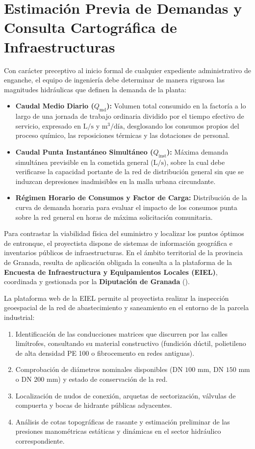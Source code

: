\documentclass{report}
\begin{document}
\section{Estimación Previa de Demandas y Consulta Cartográfica de Infraestructuras}

Con carácter preceptivo al inicio formal de cualquier expediente administrativo de enganche, el equipo de ingeniería debe determinar de manera rigurosa las magnitudes hidráulicas que definen la demanda de la planta:
\begin{itemize}
    \item \textbf{Caudal Medio Diario ($Q_{\text{md}}$):} Volumen total consumido en la factoría a lo largo de una jornada de trabajo ordinaria dividido por el tiempo efectivo de servicio, expresado en $\text{L/s}$ y $\text{m}^3/\text{día}$, desglosando los consumos propios del proceso químico, las reposiciones térmicas y las dotaciones de personal.
    \item \textbf{Caudal Punta Instantáneo Simultáneo ($Q_{\text{inst}}$):} Máxima demanda simultánea previsible en la cometida general ($\text{L/s}$), sobre la cual debe verificarse la capacidad portante de la red de distribución general sin que se induzcan depresiones inadmisibles en la malla urbana circundante.
    \item \textbf{Régimen Horario de Consumos y Factor de Carga:} Distribución de la curva de demanda horaria para evaluar el impacto de los consumos punta sobre la red general en horas de máxima solicitación comunitaria.
\end{itemize}

Para contrastar la viabilidad física del suministro y localizar los puntos óptimos de entronque, el proyectista dispone de sistemas de información geográfica e inventarios públicos de infraestructuras. En el ámbito territorial de la provincia de Granada, resulta de aplicación obligada la consulta a la plataforma de la \textbf{Encuesta de Infraestructura y Equipamientos Locales (EIEL)}, coordinada y gestionada por la \textbf{Diputación de Granada} (\cite{EIEL_Diputacion_Granada}).

La plataforma web de la EIEL permite al proyectista realizar la inspección geoespacial de la red de abastecimiento y saneamiento en el entorno de la parcela industrial:
\begin{enumerate}
    \item Identificación de las conducciones matrices que discurren por las calles limítrofes, consultando su material constructivo (fundición dúctil, polietileno de alta densidad PE 100 o fibrocemento en redes antiguas).
    \item Comprobación de diámetros nominales disponibles ($\text{DN }100\text{ mm}$, $\text{DN }150\text{ mm}$ o $\text{DN }200\text{ mm}$) y estado de conservación de la red.
    \item Localización de nudos de conexión, arquetas de sectorización, válvulas de compuerta y bocas de hidrante públicas adyacentes.
    \item Análisis de cotas topográficas de rasante y estimación preliminar de las presiones manométricas estáticas y dinámicas en el sector hidráulico correspondiente.
\end{enumerate}
\end{document}

